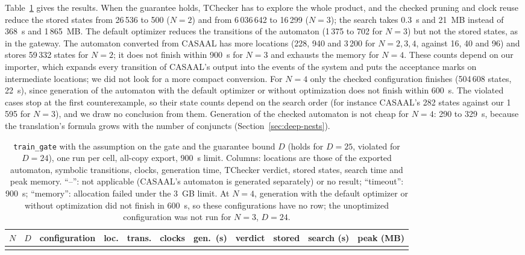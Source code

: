 Table~\ref{tab:train-gate} gives the results. When the guarantee holds, TChecker has to explore the whole product, and the checked pruning and clock reuse reduce the stored states from 26\,536 to 500 ($N=2$) and from 6\,036\,642 to 16\,299 ($N=3$); the search takes 0.3~s and 21~MB instead of 368~s and 1\,865~MB. The default optimizer reduces the transitions of the automaton (1\,375 to 702 for $N=3$) but not the stored states, as in the gateway. The automaton converted from CASAAL has more locations (228, 940 and 3\,200 for $N=2,3,4$, against 16, 40 and 96) and stores 59\,332 states for $N=2$; it does not finish within 900~s for $N=3$ and exhausts the memory for $N=4$. These counts depend on our importer, which expands every transition of CASAAL's output into the events of the system and puts the acceptance marks on intermediate locations; we did not look for a more compact conversion. For $N=4$ only the checked configuration finishes (504\,608 states, 22~s), since generation of the automaton with the default optimizer or without optimization does not finish within 600~s. The violated cases stop at the first counterexample, so their state counts depend on the search order (for instance CASAAL's 282 states against our 1\,595 for $N=3$), and we draw no conclusion from them. Generation of the checked automaton is not cheap for $N=4$: 290 to 329~s, because the translation's formula grows with the number of conjuncts (Section~\ref{sec:deep-nests}).

\begin{table}[tp]
\centering
\caption{\texttt{train\_gate} with the assumption on the gate and the guarantee bound $D$ (holds for $D=25$, violated for $D=24$), one run per cell, all-copy export, 900~s limit. Columns: locations are those of the exported automaton, symbolic transitions, clocks, generation time, TChecker verdict, stored states, search time and peak memory. ``--'': not applicable (CASAAL's automaton is generated separately) or no result; ``timeout'': 900~s; ``memory'': allocation failed under the 3~GB limit. At $N=4$, generation with the default optimizer or without optimization did not finish in 600~s, so these configurations have no row; the unoptimized configuration was not run for $N=3$, $D=24$.}
\label{tab:train-gate}
\small
\begin{adjustbox}{max width=\textwidth}
\begin{tabular}{@{}rrlrrrrlrrr@{}}
\toprule
$N$ & $D$ & configuration & loc. & trans. & clocks & gen.\ (s) & verdict & stored & search (s) & peak (MB)\\
\midrule
\\
\bottomrule
\end{tabular}
\end{adjustbox}
\end{table}

